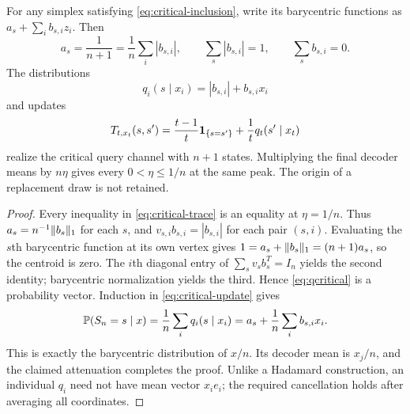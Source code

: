 \begin{proposition}
\label{prop:critical-rows}
For any simplex satisfying \eqref{eq:critical-inclusion}, write its
barycentric functions as $a_s+\sum_i b_{s,i}z_i$. Then
\begin{equation}\label{eq:critical-identities}
 a_s=\frac1{n+1}=\frac1n\sum_i|b_{s,i}|,\qquad
 \sum_s|b_{s,i}|=1,\qquad\sum_sb_{s,i}=0.
\end{equation}
The distributions
\begin{equation}\label{eq:qcritical}
             q_i(s\mid x_i)=|b_{s,i}|+b_{s,i}x_i
\end{equation}
and updates
\begin{equation}\label{eq:critical-update}
 T_{t,x_t}(s,s')=\frac{t-1}{t}\mathbf1_{\{s=s'\}}
                       +\frac1t q_t(s'\mid x_t)
\end{equation}
realize the critical query channel with $n+1$ states. Multiplying the
final decoder means by $n\eta$ gives every $0<\eta\le1/n$ at the same
peak. The origin of a replacement draw is not retained.
\end{proposition}
\begin{proof}
Every inequality in \eqref{eq:critical-trace} is an equality at
$\eta=1/n$. Thus $a_s=n^{-1}\lVert b_s\rVert_1$ for each $s$, and
$v_{s,i}b_{s,i}=|b_{s,i}|$ for each pair $(s,i)$. Evaluating the $s$th barycentric function at its own vertex gives
$1=a_s+\lVert b_s\rVert_1=(n+1)a_s$, so the centroid is zero.
The $i$th diagonal
entry of $\sum_s v_sb_s^T=I_n$ yields the second identity; barycentric
normalization yields the third. Hence \eqref{eq:qcritical} is a
probability vector. Induction in \eqref{eq:critical-update} gives
\[
 \mathbb P(S_n=s\mid x)=\frac1n\sum_iq_i(s\mid x_i)
                  =a_s+\frac1n\sum_ib_{s,i}x_i.
\]
This is exactly the barycentric distribution of $x/n$. Its decoder
mean is $x_j/n$, and the claimed attenuation completes the proof.
Unlike a Hadamard construction, an individual $q_i$ need not have
mean vector $x_ie_i$; the required cancellation holds after averaging
all coordinates.
\end{proof}

